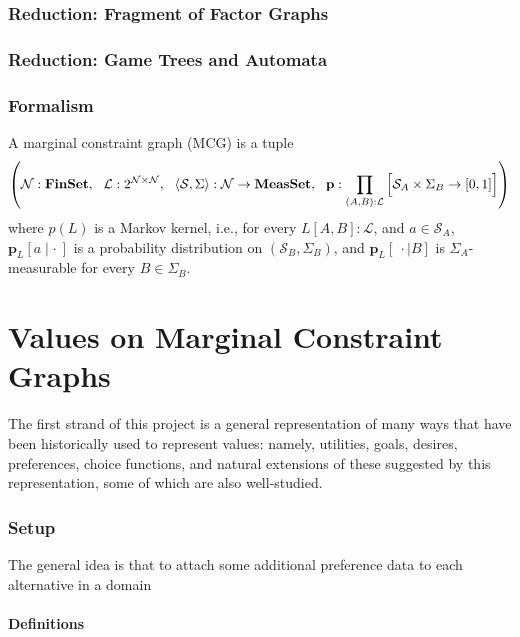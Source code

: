 \documentclass{article}
\begin{document}
	\section{Reduction: Fragment of Factor Graphs}
	\section{Reduction: Game Trees and Automata}
	\section{Formalism}
	\begin{defn}\label{def:mcg}
		A marginal constraint graph (MCG) is a tuple 
		\[ \left(\mathcal N : \mathbf{FinSet},~~\mathcal L : 2^{\cal N \times N},~~ \langle\mathcal S, \Sigma\rangle : \mathcal N \to \mathbf{MeasSet}, ~~\mathbf p : \prod_{(A,B): \mathcal L} \left[ \Big. \mathcal S_A \times \Sigma_B \to [0,1]\right] \right) \]
		where $p(L)$ is a Markov kernel, i.e., for every $L[A,B] : \mathcal L$, and $a \in \mathcal S_A$, $\mathbf p_L[a \mid \cdot~]$ is a probability distribution on $(\mathcal S_B, \Sigma_B)$, and $\mathbf p_L[~\cdot \mid B]$ is $\Sigma_A$-measurable for every $B \in \Sigma_B$.
	\end{defn}
	
	\part{Values on Marginal Constraint Graphs}
	
	The first strand of this project is a general representation of many ways that have been historically used to represent values: namely, utilities, goals, desires, preferences, choice functions, and natural extensions of these suggested by this representation, some of which are also well-studied. 
	
	\section{Setup}
	
	
	The general idea is that to attach some additional preference data to each alternative in a domain
	
	\subsection{Definitions}
	
\end{document}
